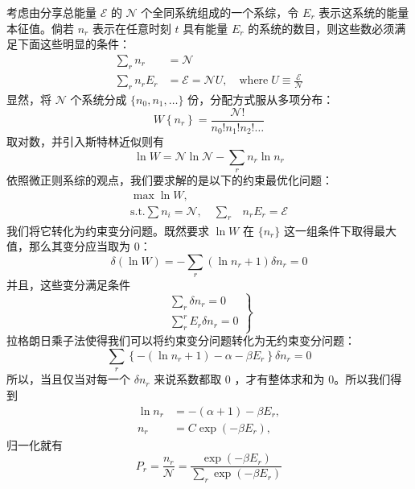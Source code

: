\documentclass[hyperref,UTF-8]{ctexbook}
\newcommand{\0}{\boldsymbol{0}}
\begin{document}
考虑由分享总能量 $\mathcal{E}$ 的 $\mathcal{N}$ 个全同系统组成的一个系综，令 $E_r$ 表示这系统的能量本征值。倘若 $n_r$ 表示在任意时刻 $t$ 具有能量 $E_r$ 的系统的数目，则这些数必须满足下面这些明显的条件：
\begin{align}
    \sum_r n_r&=\mathcal{N} \\
    \sum_r n_r E_r&=\mathcal{E}=\mathcal{N} U, \quad\text{where}\; U \equiv \frac{\mathcal{E}}{\mathcal{N}}  
\end{align}
显然，将 $\mathcal{N}$ 个系统分成 $\{n_0,n_1,\dots\}$ 份，分配方式服从多项分布：
\begin{equation}
    W\left\{n_r\right\}=\frac{\mathcal{N} !}{n_{0} ! n_{1} ! n_{2} ! \ldots}
\end{equation}
取对数，并引入斯特林近似则有
\begin{equation}
    \ln W=\mathcal{N} \ln \mathcal{N}-\sum_r n_r \ln n_r
\end{equation}
依照微正则系综的观点，我们要求解的是以下的约束最优化问题：
\begin{equation}\label{equ:optimizeIII}
    \begin{split}
        \max \ln W,&\\
        \text{s.t.}\sum n_i = \mathcal{N},\quad\sum_r &n_r E_r=\mathcal{E}
    \end{split}
\end{equation}
我们将它转化为约束变分问题。既然要求 $\ln W$ 在 $\{n_r\}$ 这一组条件下取得最大值，那么其变分应当取为 $0$：
\[
    \delta(\ln W)=-\sum_r\left(\ln n_r+1\right) \delta n_r = 0
\]
并且，这些变分满足条件
\[
    \left.\begin{array}{l}
        \sum_r \delta n_r=0 \\
        \sum_r^r E_r \delta n_r=0
        \end{array}\right\}
\]
拉格朗日乘子法使得我们可以将约束变分问题转化为无约束变分问题：
\begin{equation}\label{equ:variational}
    \sum_r\left\{-\left(\ln n_r+1\right)-\alpha-\beta E_r\right\} \delta n_r=0
\end{equation}
所以，当且仅当对每一个 $\delta n_r$ 来说系数都取 $0$ ，才有整体求和为 $0$。所以我们得到
\begin{equation}
        \begin{aligned}
            \ln n_r&=-(\alpha+1)-\beta E_r,\\
            n_r&=C \exp \left(-\beta E_r\right),
            \end{aligned}
\end{equation}
归一化就有
\begin{equation}\label{equ:canonicalprobability}
    P_r = \frac{n_r}{\mathcal{N}}=\frac{\exp \left(-\beta E_r\right)}{\sum_r \exp \left(-\beta E_r\right)}
\end{equation}
\end{document}
